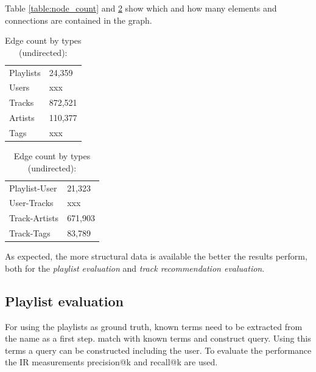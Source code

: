 \documentclass[sigconf]{acmart}
\begin{document}


Table \ref{table:node_count} and \ref{table:edge_count} show which and how many elements and connections are contained in the graph.

\begin{table}[H]
	\begin{minipage}{.5\textwidth}
		
		\centering
		\caption{Node count by type:}
		\label{table:node_count}
		\begin{tabular}{l|l}
			Playlists & 24,359  \\
			Users     & xxx     \\
			Tracks    & 872,521 \\
			Artists   & 110,377  \\
			Tags      & xxx
		\end{tabular}
		
	\end{minipage}
	\begin{minipage}{.5\textwidth}
		
		\centering
		\caption{Edge count by types (undirected):}
		\label{table:edge_count}
		\begin{tabular}{l|l}
			Playlist-User & 21,323  \\
			User-Tracks     & xxx     \\
			Track-Artists    & 671,903 \\
			Track-Tags   & 83,789
		\end{tabular}
		
	\end{minipage}
\end{table}



As expected, the more structural data is available the better the results perform, both for the \emph{playlist evaluation} and \emph{track recommendation evaluation}.

\subsection{Playlist evaluation}
\label{subsec:playlist_eval}
For using the playlists as ground truth, known terms need to be extracted from the name as a first step. match with known terms and construct query. Using this terms a query can be constructed including the user. To evaluate the performance the IR measurements precision@k and recall@k are used.
\end{document}
